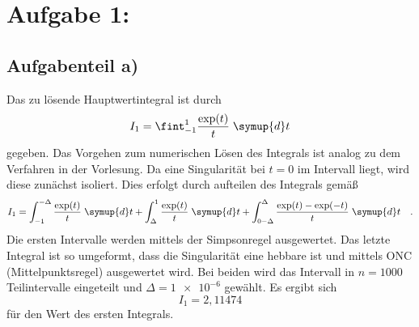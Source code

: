 \section*{Aufgabe 1: }

\subsection*{Aufgabenteil a)}
Das zu lösende Hauptwertintegral ist durch
\begin{equation*}
  I_1= \fint_{-1}^1 \frac{\exp({t})}{t} \; \symup{d}t
\end{equation*}
gegeben. Das Vorgehen zum numerischen Lösen des Integrals ist analog zu dem Verfahren in der Vorlesung.
Da eine Singularität bei $t=0$ im Intervall liegt, wird diese zunächst isoliert.
Dies erfolgt durch aufteilen des Integrals gemäß
\begin{equation*}
    I_1 = \int_{-1}^{-\Delta} \frac{\exp(t)}{t}\; \symup{d}t + \int_{\Delta}^{1} \frac{\exp({t})}{t}\; \symup{d}t +\int_{0-\Delta}^{\Delta} \frac{\exp(t)-\exp(-t)}{t} \;\symup{d}t \quad .
\end{equation*}
Die ersten Intervalle werden mittels der Simpsonregel ausgewertet. Das letzte Integral ist so umgeformt, dass die Singularität eine hebbare ist und mittels ONC (Mittelpunktsregel) ausgewertet wird. Bei beiden wird das Intervall in $n=1000$ Teilintervalle eingeteilt und $\Delta=\num{1e-6}$ gewählt.
Es ergibt sich
\begin{equation*}
  I_1=2,11474
\end{equation*}
für den Wert des ersten Integrals.
